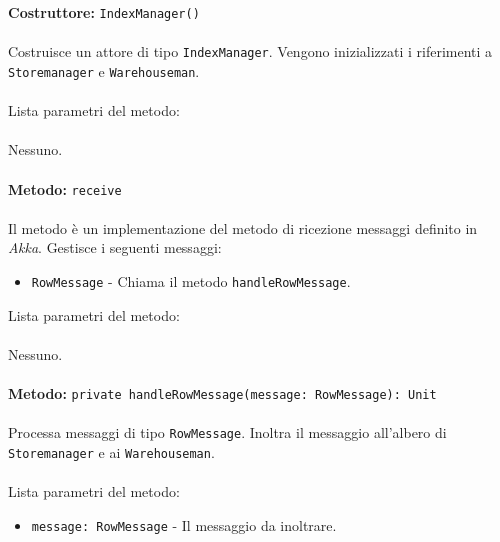 \documentclass[a4paper]{article}
\begin{document}
		\textbf{Costruttore: }\texttt{IndexManager()}
			\\ \\
			Costruisce un attore di tipo \texttt{IndexManager}. Vengono inizializzati i riferimenti a \texttt{Storemanager} e \texttt{Warehouseman}.
			\\ \\
			Lista parametri del metodo:
			\\ \\
			Nessuno.
			\\ \\
		\textbf{Metodo: }\texttt{receive}
			\\ \\
			Il metodo è un implementazione del metodo di ricezione messaggi definito in \emph{Akka}. Gestisce i seguenti messaggi:
			\begin{itemize}
				\item \texttt{RowMessage} - Chiama il metodo \texttt{handleRowMessage}.
			\end{itemize}
			Lista parametri del metodo:
			\\ \\
			Nessuno.
			\\ \\
		\textbf{Metodo: }\texttt{private handleRowMessage(message: RowMessage): Unit}
			\\ \\
			Processa messaggi di tipo \texttt{RowMessage}. Inoltra il messaggio all'albero di \texttt{Storemanager} e ai \texttt{Warehouseman}.
			\\ \\
			Lista parametri del metodo:
			\begin{itemize}
				\item \texttt{message: RowMessage} - Il messaggio da inoltrare.
			\end{itemize}	
			
			
\end{document}
